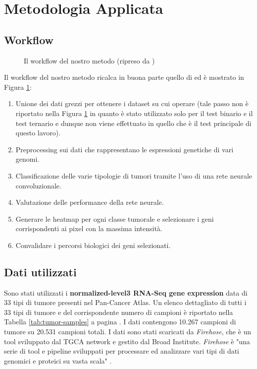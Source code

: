 \section{Metodologia Applicata}
\label{sec:methodology}
\subsection{Workflow}
\begin{figure}[hbpt!]
		\centering
		
  		\caption{Il workflow del nostro metodo (ripreso da \cite{lyu2018deep})}
        \label{fig:workflow}
\end{figure}
Il workflow del nostro metodo ricalca in buona parte quello di \cite{lyu2018deep} ed è mostrato in 
Figura \ref{fig:workflow}: 
\begin{enumerate}
    \item Unione dei dati grezzi per ottenere i dataset su cui operare (tale passo non è riportato nella Figura 
          \ref{fig:workflow} in quanto è stato utilizzato solo per il test binario e il test ternario e dunque
          non viene effettuato in quello che è il test principale di questo lavoro).
    \item Preprocessing sui dati che rappresentano le espressioni genetiche di vari genomi.
    \item Classificazione delle varie tipologie di tumori tramite l'uso di una rete neurale convoluzionale. 
    \item Valutazione delle performance della rete neurale. 
    \item Generare le heatmap per ogni classe tumorale e selezionare i geni corrispondenti ai pixel 
          con la massima intensità.
    \item Convalidare i percorsi biologici dei geni selezionati.
\end{enumerate}

\subsection{Dati utilizzati}
Sono stati utilizzati i \textbf{normalized-level3 RNA-Seq gene expression} data di 33 tipi di tumore presenti 
nel Pan-Cancer Atlas. Un elenco dettagliato di tutti i 33 tipi di tumore e del corrispondente numero di campioni è
riportato nella Tabella \ref{tab:tumor-samples} a pagina \pageref{tab:tumor-samples}. 
I dati contengono 10.267 campioni di tumore su 20.531 campioni totali. I dati sono stati scaricati 
da \textit{Firehose}\cite{firehose}, che è un tool sviluppato dal TGCA network e gestito dal Broad Institute.
\textit{Firehose} è "una serie di tool e pipeline sviluppati per processare ed analizzare vari tipi di dati genomici 
e proteici su vasta scala" \cite{tgcatools}.

